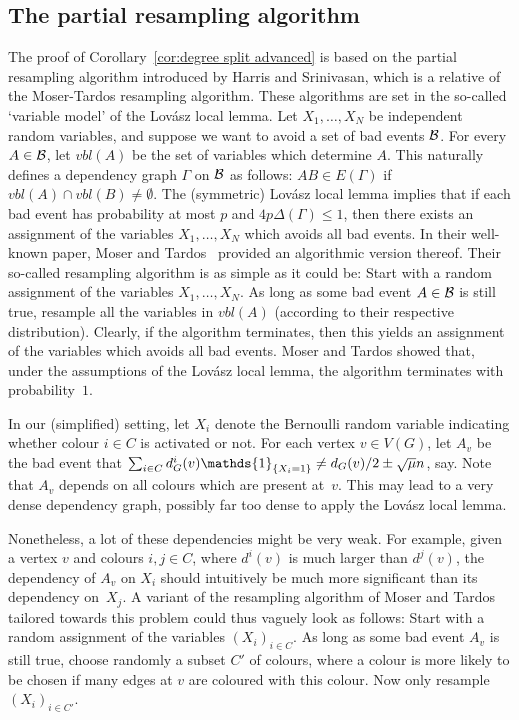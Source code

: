 \documentclass[10pt]{amsart}
\theoremstyle{definition}
\theoremstyle{claimstyle}
\theoremstyle{stepstyle}
\numberwithin{equation}{section}
\begin{document}
\subsection{The partial resampling algorithm}
The proof of Corollary~\ref{cor:degree split advanced} is based on the partial resampling algorithm introduced by Harris and Srinivasan, which is a relative of the Moser-Tardos resampling algorithm. These algorithms are set in the so-called `variable model' of the Lov\'asz local lemma.
Let $X_1,\dots,X_N$ be independent random variables, and suppose we want to avoid a set of bad events $\mathcal{B}$.
For every $A\in \mathcal{B}$, let $vbl(A)$ be the set of variables which determine $A$.
This naturally defines a dependency graph $\Gamma$ on $\mathcal{B}$ as follows: $AB \in E(\Gamma)$ if $vbl(A)\cap vbl(B)\neq\emptyset$.
The (symmetric) Lov\'asz local lemma implies that if each bad event has probability at most $p$ and $4p\Delta(\Gamma)\le 1$, then there exists an assignment of the variables $X_1,\dots, X_N$ which avoids all bad events.
In their well-known paper, Moser and Tardos~\cite{MT:10} provided an algorithmic version thereof. Their so-called resampling algorithm is as simple as it could be: Start with a random assignment of the variables $X_1,\dots,X_N$. As long as some bad event $A\in \mathcal{B}$ is still true, resample all the variables in $vbl(A)$ (according to their respective distribution).
Clearly, if the algorithm terminates, then this yields an assignment of the variables which avoids all bad events. Moser and Tardos showed that, under the assumptions of the Lov\'asz local lemma, the algorithm terminates with probability~$1$.

In our (simplified) setting, let $X_i$ denote the Bernoulli random variable indicating whether colour $i\in C$ is activated or not. For each vertex $v\in V(G)$, let $A_v$ be the bad event that $\sum_{i\in C}d_G^i(v)\mathds{1}_{\Set{X_i=1}} \neq d_G(v)/2\pm \sqrt{\mu}n$, say.
Note that $A_v$ depends on all colours which are present at~$v$. This may lead to a very dense dependency graph, possibly far too dense to apply the Lov\'asz local lemma.

Nonetheless, a lot of these dependencies might be very weak. For example, given a vertex $v$ and colours $i,j\in C$, where $d^i(v)$ is much larger than $d^j(v)$, the dependency of $A_v$ on $X_i$ should intuitively be much more significant than its dependency on~$X_j$.
A variant of the resampling algorithm of Moser and Tardos tailored towards this problem could thus vaguely look as follows: Start with a random assignment of the variables $(X_i)_{i\in C}$. As long as some bad event $A_v$ is still true, choose randomly a subset $C'$ of colours, where a colour is more likely to be chosen if many edges at $v$ are coloured with this colour. Now only resample $(X_i)_{i\in C'}$.
\end{document}
